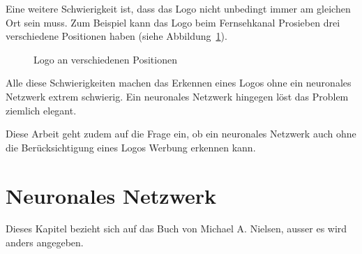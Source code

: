 \documentclass[12pt,a4paper]{report}
\begin{document}
Eine weitere Schwierigkeit ist, dass das Logo nicht unbedingt immer am gleichen Ort sein muss.
Zum Beispiel kann das Logo beim Fernsehkanal Prosieben drei verschiedene Positionen haben (siehe Abbildung~\ref{fig:logo3}).
\begin{figure}[h]%
    \centering
    \qquad
    \qquad
    \caption{Logo an verschiedenen Positionen}%
    \label{fig:logo3}%
\end{figure}
Alle diese Schwierigkeiten machen das Erkennen eines Logos ohne ein neuronales Netzwerk extrem schwierig.
Ein neuronales Netzwerk hingegen löst das Problem ziemlich elegant.

Diese Arbeit geht zudem auf die Frage ein, ob ein neuronales Netzwerk auch ohne die Berücksichtigung eines Logos Werbung erkennen kann.


\chapter{Neuronales Netzwerk}
\label{ch:neuronalesNetzwerk}
Dieses Kapitel bezieht sich auf das Buch von Michael A. Nielsen\cite{neuralbook}, ausser es wird anders angegeben.
\end{document}
